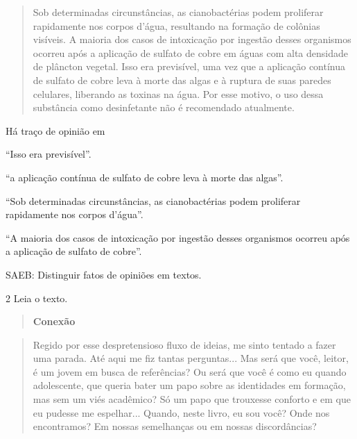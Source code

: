 \begin{quote}
Sob determinadas circunstâncias, as cianobactérias podem proliferar
rapidamente nos corpos d'água, resultando na formação de colônias
visíveis. A maioria dos casos de intoxicação por ingestão desses
organismos ocorreu após a aplicação de sulfato de cobre em águas com
alta densidade de plâncton vegetal. Isso era previsível, uma vez que a
aplicação contínua de sulfato de cobre leva à morte das algas e à
ruptura de suas paredes celulares, liberando as toxinas na água. Por
esse motivo, o uso dessa substância como desinfetante não é recomendado
atualmente.
\end{quote}


Há traço de opinião em

\begin{escolha}

\item ``Isso era previsível''.

\item ``a aplicação contínua de sulfato de cobre leva à morte das algas''.

\item ``Sob determinadas circunstâncias, as cianobactérias podem proliferar
rapidamente nos corpos d'água''.

\item ``A maioria dos casos de intoxicação por ingestão desses organismos
ocorreu após a aplicação de sulfato de cobre''.
\end{escolha}

SAEB: Distinguir fatos de opiniões em textos.

\num{2} Leia o texto.

\begin{quote}
\textbf{Conexão}
\end{quote}

\begin{quote}
Regido por esse despretensioso fluxo de ideias, me sinto tentado a fazer
uma parada. Até aqui me fiz tantas perguntas... Mas será que você,
leitor, é um jovem em busca de referências? Ou será que você é como eu
quando adolescente, que queria bater um papo sobre as identidades em
formação, mas sem um viés acadêmico? Só um papo que trouxesse conforto e
em que eu pudesse me espelhar... Quando, neste livro, eu sou você? Onde
nos encontramos? Em nossas semelhanças ou em nossas discordâncias?
\end{quote}

